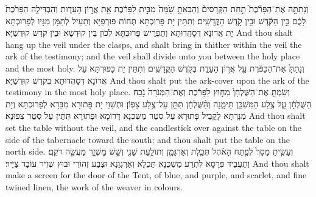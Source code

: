 {{וְנָתַתָּ֣ה אֶת־הַפָּרֹ֘כֶת֮ תַּ֣חַת הַקְּרָסִים֒ וְהֵבֵאתָ֥ שָׁ֙מָּה֙ מִבֵּ֣ית לַפָּרֹ֔כֶת אֵ֖ת אֲר֣וֹן הָעֵד֑וּת וְהִבְדִּילָ֤ה הַפָּרֹ֙כֶת֙ לָכֶ֔ם בֵּ֣ין הַקֹּ֔דֶשׁ וּבֵ֖ין קֹ֥דֶשׁ הַקֳּדָשִֽׁים׃}
{וְתִתֵּין יָת פָּרוּכְתָּא תְּחוֹת פּוּרְפַיָּא וְתַעֵיל לְתַמָּן מִגָּיו לְפָרוּכְתָּא יָת אֲרוֹנָא דְּסָהֲדוּתָא וְתַפְרֵישׁ פָּרוּכְתָּא לְכוֹן בֵּין קוּדְשָׁא וּבֵין קֹדֶשׁ קוּדְשַׁיָּא׃}
{And thou shalt hang up the veil under the clasps, and shalt bring in thither within the veil the ark of the testimony; and the veil shall divide unto you between the holy place and the most holy.}{}
{וְנָתַתָּ֙ אֶת־הַכַּפֹּ֔רֶת עַ֖ל אֲר֣וֹן הָעֵדֻ֑ת בְּקֹ֖דֶשׁ הַקֳּדָשִֽׁים׃}
{וְתִתֵּין יָת כָּפוּרְתָּא עַל אֲרוֹנָא דְּסָהֲדוּתָא בְּקֹדֶשׁ קוּדְשַׁיָּא׃}
{And thou shalt put the ark-cover upon the ark of the testimony in the most holy place.}{}
{וְשַׂמְתָּ֤ אֶת־הַשֻּׁלְחָן֙ מִח֣וּץ לַפָּרֹ֔כֶת וְאֶת־הַמְּנֹרָה֙ נֹ֣כַח הַשֻּׁלְחָ֔ן עַ֛ל צֶ֥לַע הַמִּשְׁכָּ֖ן תֵּימָ֑נָה וְהַ֨שֻּׁלְחָ֔ן תִּתֵּ֖ן עַל־צֶ֥לַע צָפֽוֹן׃
}
{וּתְשַׁוֵּי יָת פָּתוּרָא מִבַּרָא לְפָרוּכְתָּא וְיָת מְנָרְתָא לָקֳבֵיל פָּתוּרָא עַל סְטַר מַשְׁכְּנָא דָּרוֹמָא וּפָתוּרָא תִּתֵּין עַל סְטַר צִפּוּנָא׃}
{And thou shalt set the table without the veil, and the candlestick over against the table on the side of the tabernacle toward the south; and thou shalt put the table on the north side.}{}
{וְעָשִׂ֤יתָ מָסָךְ֙ לְפֶ֣תַח הָאֹ֔הֶל תְּכֵ֧לֶת וְאַרְגָּמָ֛ן וְתוֹלַ֥עַת שָׁנִ֖י וְשֵׁ֣שׁ מׇשְׁזָ֑ר מַעֲשֵׂ֖ה רֹקֵֽם׃
}
{וְתַעֲבֵיד פְּרָסָא לִתְרַע מַשְׁכְּנָא תַּכְלָא וְאַרְגְּוָנָא וּצְבַע זְהוֹרִי וּבוּץ שְׁזִיר עוֹבָד צַיָּיר׃}
{And thou shalt make a screen for the door of the Tent, of blue, and purple, and scarlet, and fine twined linen, the work of the weaver in colours.}{}
}
